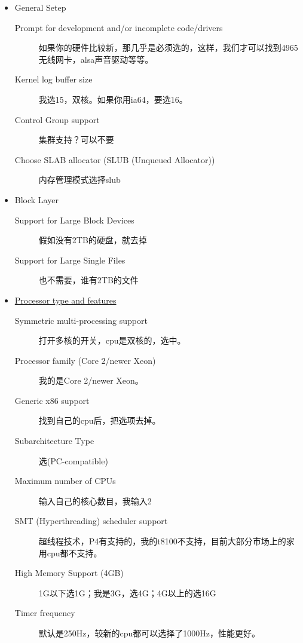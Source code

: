 \begin{itemize}
\item General Setep
\begin{description}
\item[Prompt for development and/or incomplete code/drivers]	如果你的硬件比较新，那几乎是必须选的，这样，我们才可以找到4965无线网卡，alsa声音驱动等等。

\item[Kernel log buffer size]	我选15，双核。如果你用ia64，要选16。

\item[Control Group support]		集群支持？可以不要

\item[Choose SLAB allocator (SLUB (Unqueued Allocator))]	 内存管理模式选择slub
\end{description}


\item Block Layer
\begin{description}
\item[Support for Large Block Devices]	假如没有2TB的硬盘，就去掉

\item[Support for Large Single Files]	也不需要，谁有2TB的文件
\end{description}


\item \underline{Processor type and features}
\begin{description}
\item[Symmetric multi-processing support]	打开多核的开关，cpu是双核的，选中。

\item[Processor family (Core 2/newer Xeon)]	我的是Core 2/newer Xeon。

\item[Generic x86 support]	找到自己的cpu后，把选项去掉。

\item[Subarchitecture Type]	选(PC-compatible)

\item[Maximum number of CPUs]	输入自己的核心数目，我输入2

\item[SMT (Hyperthreading) scheduler support]	超线程技术，P4有支持的，我的t8100不支持，目前大部分市场上的家用cpu都不支持。

\item[High Memory Support (4GB)]	1G以下选1G；我是3G，选4G；4G以上的选16G

\item[Timer frequency]	默认是250Hz，较新的cpu都可以选择了1000Hz，性能更好。
\end{description}



\end{itemize}
